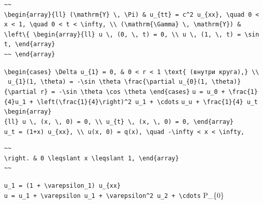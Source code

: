 \documentclass[
  ukrainian,
]{article}
\begin{document}
\begin{verbatim}
~~
\begin{array}{ll} (\mathrm{Y} \, \Pi) & u_{tt} = c^2 u_{xx}, \quad 0 < x < 1, \quad 0 < t < \infty, \\ (\mathrm{\Gamma} \, \mathrm{Y}) & \left\{ \begin{array}{ll} u \, (0, \, t) = 0, \\ u \, (1, \, t) = \sin t, \end{array}
~~ \end{array}
\end{verbatim}

\texttt{\textbackslash{}begin\{cases\}\ \textbackslash{}Delta\ u\_\{1\}\ =\ 0,\ \&\ 0\ \textless{}\ r\ \textless{}\ 1\ \textbackslash{}text\{\ (внутри\ круга),\}\ \textbackslash{}\textbackslash{}\ u\_\{1\}(1,\ \textbackslash{}theta)\ =\ -\textbackslash{}sin\ \textbackslash{}theta\ \textbackslash{}frac\{\textbackslash{}partial\ u\_\{0\}(1,\ \textbackslash{}theta)\}\{\textbackslash{}partial\ r\}\ =\ -\textbackslash{}sin\ \textbackslash{}theta\ \textbackslash{}cos\ \textbackslash{}theta\ \textbackslash{}end\{cases\}}
\texttt{u\ =\ u\_0\ +\ \textbackslash{}frac\{1\}\{4\}u\_1\ +\ \textbackslash{}left(\textbackslash{}frac\{1\}\{4\}\textbackslash{}right)\^{}2\ u\_1\ +\ \textbackslash{}cdots}
\texttt{u\_u\ +\ \textbackslash{}frac\{1\}\{4\}\ u\_t}
\texttt{\textbackslash{}begin\{array\}\{ll\}\ u\ \textbackslash{},\ (x,\ \textbackslash{},\ 0)\ =\ 0,\ \textbackslash{}\textbackslash{}\ u\_\{t\}\ \textbackslash{},\ (x,\ \textbackslash{},\ 0)\ =\ 0,\ \textbackslash{}end\{array\}}
\texttt{u\_t\ =\ (1+x)\ u\_\{xx\},\ \textbackslash{}\textbackslash{}\ u(x,\ 0)\ =\ q(x),\ \textbackslash{}quad\ -\textbackslash{}infty\ \textless{}\ x\ \textless{}\ \textbackslash{}infty,}

\begin{verbatim}
~~
\right. & 0 \leqslant x \leqslant 1, \end{array}
~~
\end{verbatim}

\texttt{u\_1\ =\ (1\ +\ \textbackslash{}varepsilon\_1)\ u\_\{xx\}}
\texttt{u\ =\ u\_1\ +\ \textbackslash{}varepsilon\ u\_1\ +\ \textbackslash{}varepsilon\^{}2\ u\_2\ +\ \textbackslash{}cdots}
P\_\{0\}
\end{document}
